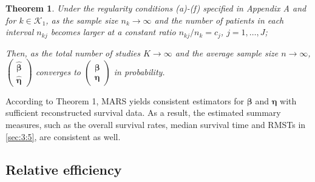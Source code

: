 \documentclass[12pt]{article}
\theoremstyle{mystyle}
\newtheorem{theorem}{Theorem}
\begin{document}
\begin{theorem}
Under the regularity conditions (a)-(f) specified in Appendix A and for $k\in\mathcal{K}_1$, as the sample size $n_k \rightarrow \infty$ and the number of patients in each interval $n_{kj}$ becomes larger at a constant ratio $n_{kj}/n_k=c_j$, $j=1,\dots,J$;

Then, as the total number of studies $K \rightarrow \infty$ and the average sample size $n \rightarrow \infty$, $\begin{pmatrix} \hat{\boldsymbol\beta}\\\hat{\boldsymbol\eta} \end{pmatrix}$ converges to $\begin{pmatrix} \boldsymbol\beta\\\boldsymbol\eta \end{pmatrix}$ in probability.
\end{theorem}

According to Theorem 1, MARS yields consistent estimators for $\boldsymbol\beta$ and $\boldsymbol\eta$ with sufficient reconstructed survival data. As a result, the estimated summary measures, such as the overall survival rates, median survival time and RMSTs in \ref{sec:3:5},
are consistent as well.

\subsection{Relative efficiency}
\end{document}
